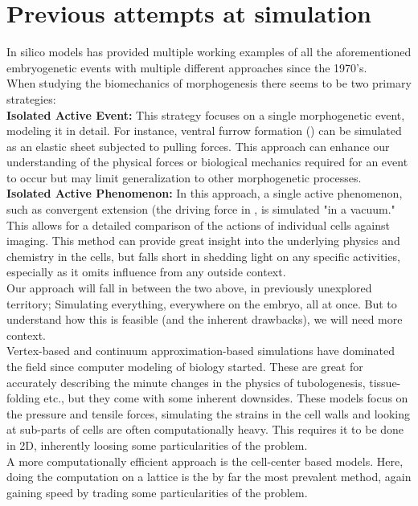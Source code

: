 \newpage
\section{Previous attempts at simulation}
In silico models has provided multiple working examples of all the aforementioned embryogenetic events with multiple different approaches since the 1970's. \\
When studying the biomechanics of morphogenesis there seems to be two primary strategies:\\

\textbf{Isolated Active Event:} This strategy focuses on a single morphogenetic event, modeling it in detail. For instance, ventral furrow formation () can be simulated as an elastic sheet subjected to pulling forces. This approach can enhance our understanding of the physical forces or biological mechanics required for an event to occur but may limit generalization to other morphogenetic processes.\\

\textbf{Isolated Active Phenomenon:} In this approach, a single active phenomenon, such as convergent extension (the driving force in , is simulated "in a vacuum." This allows for a detailed comparison of the actions of individual cells against imaging. This method can provide great insight into the underlying physics and chemistry in the cells, but falls short in shedding light on any specific activities, especially as it omits influence from any outside context.\\

Our approach will fall in between the two above, in previously unexplored territory; Simulating everything, everywhere on the embryo, all at once. But to understand how this is feasible (and the inherent drawbacks), we will need more context.\\


Vertex-based and continuum approximation-based simulations have dominated the field since computer modeling of biology started. These are great for accurately describing the minute changes in the physics of tubologenesis, tissue-folding etc., but they come with some inherent downsides. These models focus on the pressure and tensile forces, simulating the strains in the cell walls and looking at sub-parts of cells are often computationally heavy. This requires it to be done in 2D\cite{krajnc2018fluidization}, inherently loosing some particularities of the problem.\\ A more computationally efficient approach is the cell-center based models. Here, doing the computation on a lattice is the by far the most prevalent method, again gaining speed by trading some particularities of the problem.\\   

